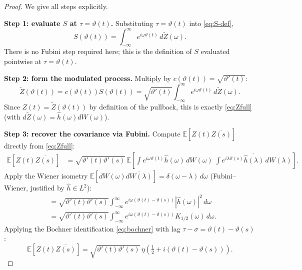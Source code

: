 \documentclass[11pt,a4paper]{article}
\begin{document}
\begin{proof}
We give all steps explicitly.

\medskip\noindent\textbf{Step 1: evaluate $S$ at $\tau=\vartheta(t)$.}
Substituting $\tau=\vartheta(t)$ into \eqref{eq:S-def},
\begin{equation}
  \label{eq:S-at-theta}
  S(\vartheta(t))
  =\int_{-\infty}^{\infty} e^{i\omega\vartheta(t)}\,d\widetilde{Z}(\omega).
\end{equation}
There is no Fubini step required here; this is the definition of $S$ evaluated
pointwise at $\tau=\vartheta(t)$.

\medskip\noindent\textbf{Step 2: form the modulated process.}
Multiply by $c(\vartheta(t))=\sqrt{\vartheta'(t)}$:
\begin{equation}
  \label{eq:Ztilde-expand}
  \widetilde{Z}(\vartheta(t))
  =c(\vartheta(t))S(\vartheta(t))
  =\sqrt{\vartheta'(t)}\int_{-\infty}^{\infty} e^{i\omega\vartheta(t)}\,d\widetilde{Z}(\omega).
\end{equation}
Since $Z(t)=\widetilde{Z}(\vartheta(t))$ by definition of the pullback, this is
exactly \eqref{eq:Zfull} (with $d\widetilde{Z}(\omega)=\hat{h}(\omega)dW(\omega)$).

\medskip\noindent\textbf{Step 3: recover the covariance via Fubini.}
Compute $\mathbb{E}[Z(t)\overline{Z(s)}]$ directly from \eqref{eq:Zfull}:
\begin{align}
  \mathbb{E}[Z(t)\overline{Z(s)}]
  &=\sqrt{\vartheta'(t)\vartheta'(s)}\,
    \mathbb{E}\!\left[
      \int e^{i\omega\vartheta(t)}\hat{h}(\omega)\,dW(\omega)\;
      \overline{\int e^{i\lambda\vartheta(s)}\hat{h}(\lambda)\,dW(\lambda)}
    \right].
\end{align}
Apply the Wiener isometry $\mathbb{E}[dW(\omega)\overline{dW(\lambda)}]=\delta(\omega-\lambda)\,d\omega$
(Fubini--Wiener, justified by $\hat{h}\in L^2$):
\begin{align}
  &=\sqrt{\vartheta'(t)\vartheta'(s)}
    \int_{-\infty}^{\infty}
    e^{i\omega(\vartheta(t)-\vartheta(s))}|\hat{h}(\omega)|^2\,d\omega \\
  &=\sqrt{\vartheta'(t)\vartheta'(s)}
    \int_{-\infty}^{\infty}
    e^{i\omega(\vartheta(t)-\vartheta(s))}K_{1/2}(\omega)\,d\omega.
\end{align}
Applying the Bochner identification \eqref{eq:bochner} with lag
$\tau-\sigma=\vartheta(t)-\vartheta(s)$:
\begin{equation}
  \label{eq:Zcov}
  \mathbb{E}[Z(t)\overline{Z(s)}]
  =\sqrt{\vartheta'(t)\vartheta'(s)}\,\eta\!\left(\tfrac{1}{2}+i(\vartheta(t)-\vartheta(s))\right).
\end{equation}


\end{proof}
\end{document}
